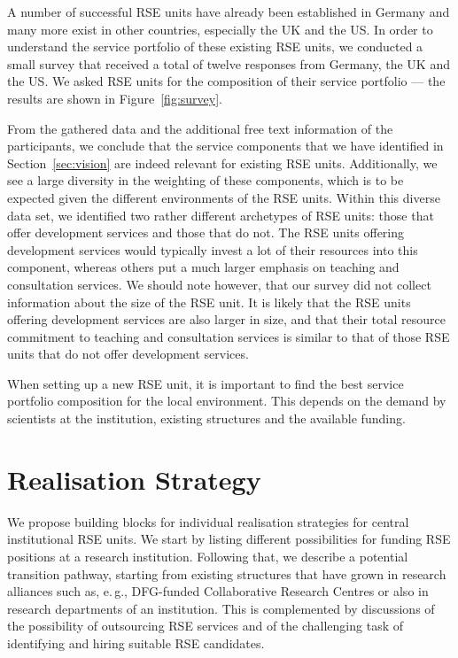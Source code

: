 \documentclass[10pt,letterpaper]{article}
\newcommand*{\eg}{e.\,g.,\xspace}
\begin{document}
A number of successful RSE units have already been established in Germany and many more exist in other countries, especially the UK and the US\@.
In order to understand the service portfolio of these existing RSE units, we conducted a small survey that received a total of twelve responses from Germany, the UK and the US\@.
We asked RSE units for the composition of their service portfolio --- the results are shown in Figure~\ref{fig:survey}.

From the gathered data and the additional free text information of the participants, we conclude that the service components that we have identified in Section~\ref{sec:vision} are indeed relevant for existing RSE units.
Additionally, we see a large diversity in the weighting of these components, which is to be expected given the different environments of the RSE units.
Within this diverse data set, we identified two rather different archetypes of RSE units: those that offer development services and those that do not.
The RSE units offering development services would typically invest a lot of their resources into this component, whereas others put a much larger emphasis on teaching and consultation services.
We should note however, that our survey did not collect information about the size of the RSE unit.
It is likely that the RSE units offering development services are also larger in size,
  and that their total resource commitment to teaching and consultation services is similar to that of those RSE units that do not offer development services.

When setting up a new RSE unit, it is important to find the best service portfolio composition for the local environment.
This depends on the demand by scientists at the institution, existing structures and the available funding.

\section*{Realisation Strategy}%
\label{sec:realisation}

We propose building blocks for individual realisation strategies for central institutional RSE units.
We start by listing different possibilities for funding RSE positions at a research institution.
Following that, we describe a potential transition pathway, starting from existing structures that have grown in research alliances such as, \eg{} DFG-funded Collaborative Research Centres or also in research departments of an institution.
This is complemented by discussions of the possibility of outsourcing RSE services and of the challenging task of identifying and hiring suitable RSE candidates.
\end{document}
